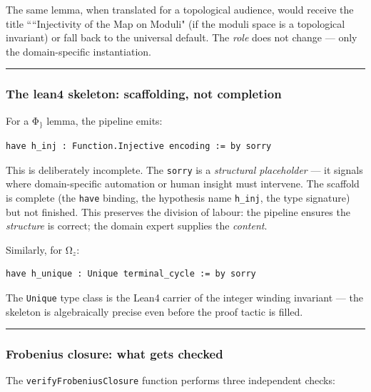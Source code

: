 \documentclass[12pt,a4paper]{article}
\begin{document}
The same lemma, when translated for a topological audience, would receive the title ````Injectivity of the Map on Moduli" (if the moduli space is a topological invariant) or fall back to the universal default. The \emph{role} does not change --- only the domain-specific instantiation.

\begin{center}
\rule{0.5\textwidth}{0.4pt}
\end{center}

\subsubsection{The lean4 skeleton: scaffolding, not completion}

For a $\text{Φ}_{\text{\}}}$ lemma, the pipeline emits:

\begin{lstlisting}[language=lean]
have h_inj : Function.Injective encoding := by sorry
\end{lstlisting}

This is deliberately incomplete. The \texttt{sorry} is a \emph{structural placeholder} --- it signals where domain-specific automation or human insight must intervene. The scaffold is complete (the \texttt{have} binding, the hypothesis name \texttt{h\_inj}, the type signature) but not finished. This preserves the division of labour: the pipeline ensures the \emph{structure} is correct; the domain expert supplies the \emph{content}.

Similarly, for $\text{Ω}_{z}$:

\begin{lstlisting}[language=lean]
have h_unique : Unique terminal_cycle := by sorry
\end{lstlisting}

The \texttt{Unique} type class is the Lean4 carrier of the integer winding invariant --- the skeleton is algebraically precise even before the proof tactic is filled.

\begin{center}
\rule{0.5\textwidth}{0.4pt}
\end{center}

\subsubsection{Frobenius closure: what gets checked}

The \texttt{verifyFrobeniusClosure} function performs three independent checks:
\end{document}
